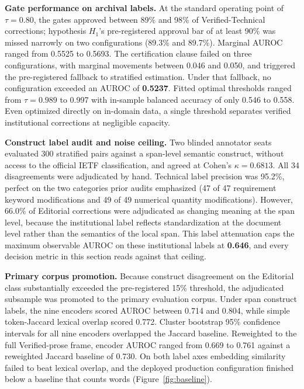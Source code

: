 \documentclass[11pt]{article}
\begin{document}
\textbf{Gate performance on archival labels.} At the standard operating point of $\tau = 0.80$, the gates approved between 89\% and 98\% of Verified-Technical corrections; hypothesis $H_1$'s pre-registered approval bar of at least 90\% was missed narrowly on two configurations (89.3\% and 89.7\%). Marginal AUROC ranged from 0.5525 to 0.5693. The certification clause failed on three configurations, with marginal movements between 0.046 and 0.050, and triggered the pre-registered fallback to stratified estimation. Under that fallback, no configuration exceeded an AUROC of \textbf{0.5237}. Fitted optimal thresholds ranged from $\tau = 0.989$ to 0.997 with in-sample balanced accuracy of only 0.546 to 0.558. Even optimized directly on in-domain data, a single threshold separates verified institutional corrections at negligible capacity.

\textbf{Construct label audit and noise ceiling.} Two blinded annotator seats evaluated 300 stratified pairs against a span-level semantic construct, without access to the official IETF classification, and agreed at Cohen's $\kappa = 0.6813$. All 34 disagreements were adjudicated by hand. Technical label precision was 95.2\%, perfect on the two categories prior audits emphasized (47 of 47 requirement keyword modifications and 49 of 49 numerical quantity modifications). However, 66.0\% of Editorial corrections were adjudicated as changing meaning at the span level, because the institutional label reflects standardization at the document level rather than the semantics of the local span. This label attenuation caps the maximum observable AUROC on these institutional labels at \textbf{0.646}, and every decision metric in this section reads against that ceiling.

\textbf{Primary corpus promotion.} Because construct disagreement on the Editorial class substantially exceeded the pre-registered 15\% threshold, the adjudicated subsample was promoted to the primary evaluation corpus. Under span construct labels, the nine encoders scored AUROC between 0.714 and 0.804, while simple token-Jaccard lexical overlap scored 0.772. Cluster bootstrap 95\% confidence intervals for all nine encoders overlapped the Jaccard baseline. Reweighted to the full Verified-prose frame, encoder AUROC ranged from 0.669 to 0.761 against a reweighted Jaccard baseline of 0.730. On both label axes embedding similarity failed to beat lexical overlap, and the deployed production configuration finished below a baseline that counts words (Figure~\ref{fig:baseline}).
\end{document}
